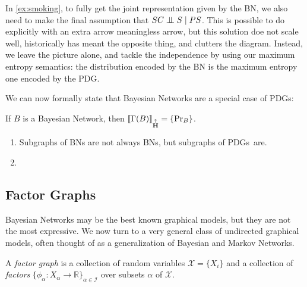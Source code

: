 \documentclass{article}
\newcommand\changeon{\color{note-fg} }
\newcommand\MaxEnt{{\overset{\uparrow}{\mathbf H}}}
\newcommand{\MN}{PDG}
\newcommand{\MNs}{\MN s}
\begin{document}
	
	
	


	
	In \cref{ex:smoking}, to fully get the joint representation given by the BN, we also need to make the final assumption that $SC \mathrel{\perp\mspace{-10mu}\perp} S \mid PS$. This is possible to do explicitly with an extra arrow meaningless arrow, but this solution doe not scale well, historically has meant the opposite thing, and clutters the diagram. Instead, we leave the picture alone, and tackle the independence by using our maximum entropy semantics: the distribution encoded by the BN is the maximum entropy one encoded by the \MN.

	We can now formally state that Bayesian Networks are a special case of \MNs: 
	\begin{theorem}
		If $B$ is a Bayesian Network, then $\bbr{\Gamma(B)}_\MaxEnt =\{\Pr_B\}$.
	\end{theorem}

	\begin{fact}
		\begin{enumerate}
			\item Subgraphs of BNs are not always BNs, but subgraphs of \MNs\ are.
			\item 
		\end{enumerate}
	\end{fact}
	
	\subsection{Factor Graphs} \label{sec:factor-graphs}
	\changeon
	Bayesian Networks may be the best known graphical models, but they are not the most expressive. We now turn to a very general class of undirected graphical models, often thought of as a generalization of Bayesian and Markov Networks.
	\begin{defn}
		A \emph{factor graph} is a collection of random variables $\mathcal X = \{X_i\}$ and a collection of \emph{factors} $\{\phi_\alpha\colon X_\alpha \to \mathbb R\}_{\alpha \in \mathcal I }$ over subsets $\alpha$ of $\mathcal X$.
	\end{defn}
\end{document}

